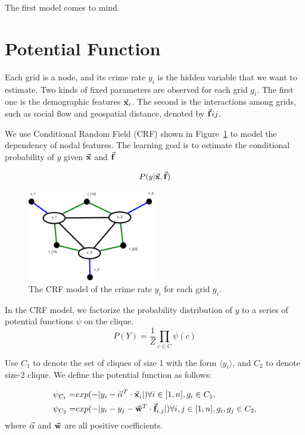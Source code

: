 
\label{apdx:crf}
The first model comes to mind.

\section{Potential Function}
Each grid is a node, and its crime rate $y_i$ is the hidden variable that we want to estimate. Two kinds of fixed parameters are observed for each grid $g_i$. The first one is the demographic features $\vec{\mathbf{x}}_i$. The second is the interactions among grids, such as social flow and geospatial distance, denoted by $\vec{\mathbf{f}}{ij}$.

We use Conditional Random Field (CRF) shown in Figure~\ref{fig:crf} to model the dependency of nodal features. The learning goal is to estimate the conditional probability of $y$ given $\vec{\mathbf{x}}$ and $\vec{\mathbf{f}}$

\begin{equation}
	P(y |  \vec{\mathbf{x}}, \vec{\mathbf{f}}) 
\end{equation}


\begin{figure}[hb]
	\centering
	\includegraphics[width=0.5\textwidth]{fig/CRF-fig.pdf}
	\caption{The CRF model of the crime rate $y_i$ for each grid $g_i$.}
	\label{fig:crf}
\end{figure}



In the CRF model, we factorize the probability distribution of $y$ to a series of potential functions $\psi$ on the clique. 
\begin{equation}
	P(Y) = \frac{1}{Z} \prod_{ c \in C} \psi(c)
\end{equation}

Use $C_1$ to denote the set of cliques of size 1 with the form $\langle y_i \rangle$, and $C_2$ to denote size-2 clique. We define the potential function as follows:

\begin{align}
	\psi_{C_1} = &exp( - |y_i - \vec{\mathbf{\alpha}}^T \cdot \vec{\mathbf{x}}_i| )  \forall i \in [1, n], {g_i} \in C_1, \\
	\psi_{C_2} = & exp( - |y_i - y_j - \vec{\mathbf{w}}^T \cdot \vec{\mathbf{f}}_{i,j}| )  \forall i,j \in [1, n], {g_i, g_j} \in C_2, 
\end{align}
where $\vec{\mathbf{\alpha}}$ and $\vec{\mathbf{w}}$ are all positive coefficients.

